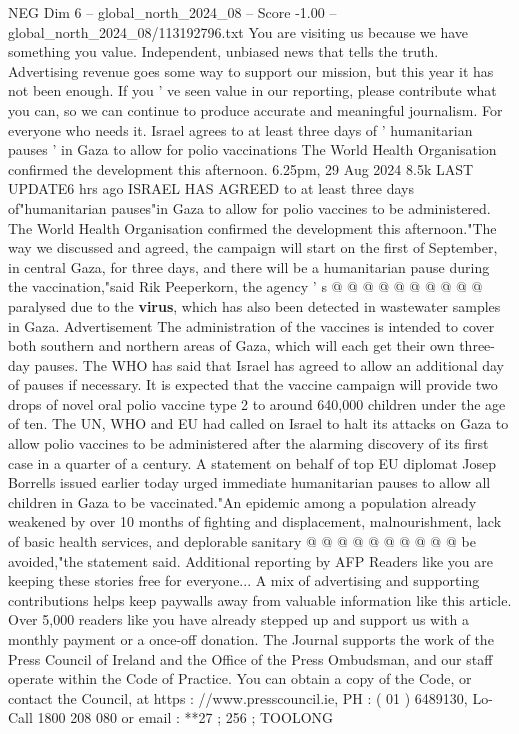 \begin{textsample}{NEG Dim 6 – global\_north\_2024\_08 – Score -1.00 – global\_north\_2024\_08/113192796.txt}  \label{ex:f6_neg_165}
You are visiting us because we have something you value.
Independent, unbiased news that tells the truth.
Advertising revenue goes some way to support our mission, but this year it has not been enough.
If you ' ve seen value in our reporting, please contribute what you can, so we can continue to produce accurate and meaningful journalism.
For everyone who needs it.
Israel agrees to at least three days of ' humanitarian pauses ' in Gaza to allow for polio vaccinations The World Health Organisation confirmed the development this afternoon. 6.25pm, 29 Aug 2024 8.5k LAST UPDATE6 hrs ago ISRAEL HAS AGREED to at least three days of"humanitarian pauses"in Gaza to allow for polio vaccines to be administered.
The World Health Organisation confirmed the development this afternoon."The way we discussed and agreed, the campaign will start on the first of September, in central Gaza, for three days, and there will be a humanitarian pause during the vaccination,"said Rik Peeperkorn, the agency ' s @ @ @ @ @ @ @ @ @ @ paralysed due to the \textbf{virus}, which has also been detected in wastewater samples in Gaza.
Advertisement The administration of the vaccines is intended to cover both southern and northern areas of Gaza, which will each get their own three-day pauses.
The WHO has said that Israel has agreed to allow an additional day of pauses if necessary.
It is expected that the vaccine campaign will provide two drops of novel oral polio vaccine type 2 to around 640,000 children under the age of ten.
The UN, WHO and EU had called on Israel to halt its attacks on Gaza to allow polio vaccines to be administered after the alarming discovery of its first case in a quarter of a century.
A statement on behalf of top EU diplomat Josep Borrells issued earlier today urged immediate humanitarian pauses to allow all children in Gaza to be vaccinated."An epidemic among a population already weakened by over 10 months of fighting and displacement, malnourishment, lack of basic health services, and deplorable sanitary @ @ @ @ @ @ @ @ @ @ be avoided,"the statement said.
Additional reporting by AFP Readers like you are keeping these stories free for everyone...
A mix of advertising and supporting contributions helps keep paywalls away from valuable information like this article.
Over 5,000 readers like you have already stepped up and support us with a monthly payment or a once-off donation.
The Journal supports the work of the Press Council of Ireland and the Office of the Press Ombudsman, and our staff operate within the Code of Practice.
You can obtain a copy of the Code, or contact the Council, at https : //www.presscouncil.ie, PH : ( 01 ) 6489130, Lo-Call 1800 208 080 or email : **27 ; 256 ; TOOLONG

\end{textsample}
